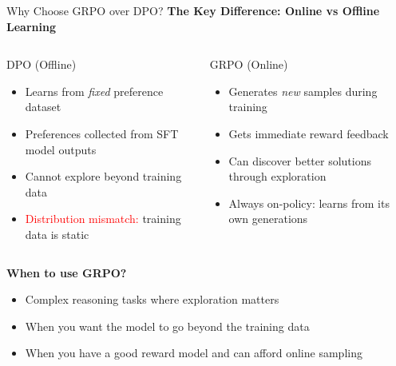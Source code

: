 \documentclass[xcolor=svgnames, 10pt, handout]{beamer}
\begin{document}
\begin{frame}{Why Choose GRPO over DPO?}
    \textbf{The Key Difference: Online vs Offline Learning}
    \pause

    \begin{columns}[T]
    \begin{block}{DPO (Offline)}
        \begin{itemize}
            \item Learns from \textit{fixed} preference dataset
            \pause
            \item Preferences collected from SFT model outputs
            \pause
            \item Cannot explore beyond training data
            \pause
            \item \textcolor{red}{Distribution mismatch:} training data is static
        \end{itemize}
    \end{block}

    \pause
    \begin{block}{GRPO (Online)}
        \begin{itemize}
            \item Generates \textit{new} samples during training
            \pause
            \item Gets immediate reward feedback
            \pause
            \item Can discover better solutions through exploration
            \pause
            \item \textcolor{green!50!black}{Always on-policy:} learns from its own generations
        \end{itemize}
    \end{block}
    \end{columns}
    \pause

    \vspace{0.3cm}
    \textbf{When to use GRPO?}
    \begin{itemize}
        \item Complex reasoning tasks where exploration matters
        \item When you want the model to go beyond the training data
        \item When you have a good reward model and can afford online sampling
    \end{itemize}
\end{frame}
\end{document}

